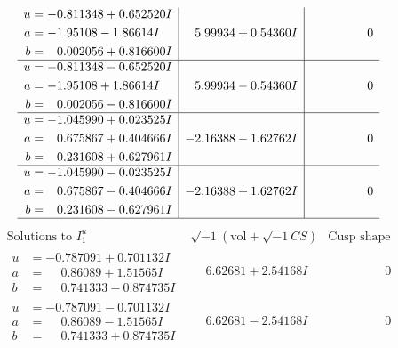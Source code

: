 \documentclass[1p]{elsarticle_modified}
\theoremstyle{definition}
\newcommand{\I}{\sqrt{-1}}
\begin{document}
$$\begin{array}{c|c|c}
\begin{aligned}
u &= -0.811348 + 0.652520 I \\
a &= -1.95108 - 1.86614 I \\
b &= \phantom{-}0.002056 + 0.816600 I\end{aligned}
 & \phantom{-}5.99934 + 0.54360 I & \phantom{-0.000000 } 0 \\ \hline\begin{aligned}
u &= -0.811348 - 0.652520 I \\
a &= -1.95108 + 1.86614 I \\
b &= \phantom{-}0.002056 - 0.816600 I\end{aligned}
 & \phantom{-}5.99934 - 0.54360 I & \phantom{-0.000000 } 0 \\ \hline\begin{aligned}
u &= -1.045990 + 0.023525 I \\
a &= \phantom{-}0.675867 + 0.404666 I \\
b &= \phantom{-}0.231608 + 0.627961 I\end{aligned}
 & -2.16388 - 1.62762 I & \phantom{-0.000000 } 0 \\ \hline\begin{aligned}
u &= -1.045990 - 0.023525 I \\
a &= \phantom{-}0.675867 - 0.404666 I \\
b &= \phantom{-}0.231608 - 0.627961 I\end{aligned}
 & -2.16388 + 1.62762 I & \phantom{-0.000000 } 0\\
 \hline 
 \end{array}$$\newpage$$\begin{array}{c|c|c}  
\text{Solutions to }I^u_{1}& \I (\text{vol} + \sqrt{-1}CS) & \text{Cusp shape}\\
 \hline 
\begin{aligned}
u &= -0.787091 + 0.701132 I \\
a &= \phantom{-}0.86089 + 1.51565 I \\
b &= \phantom{-}0.741333 - 0.874735 I\end{aligned}
 & \phantom{-}6.62681 + 2.54168 I & \phantom{-0.000000 } 0 \\ \hline\begin{aligned}
u &= -0.787091 - 0.701132 I \\
a &= \phantom{-}0.86089 - 1.51565 I \\
b &= \phantom{-}0.741333 + 0.874735 I\end{aligned}
 & \phantom{-}6.62681 - 2.54168 I & \phantom{-0.000000 } 0 \\ \hline\begin{aligned}

\end{aligned}
\end{array}$$
\end{document}
